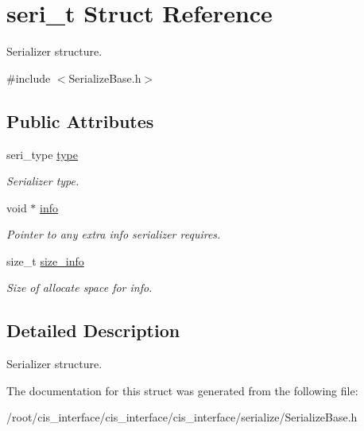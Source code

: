 \hypertarget{structseri__t}{}\section{seri\+\_\+t Struct Reference}
\label{structseri__t}


Serializer structure.  




{\ttfamily \#include $<$Serialize\+Base.\+h$>$}

\subsection*{Public Attributes}
\begin{DoxyCompactItemize}
\item 
\mbox{\label{structseri__t_a4278a7440cc158eb8c28010c5ad73724}} 
seri\+\_\+type \mbox{\hyperlink{structseri__t_a4278a7440cc158eb8c28010c5ad73724}{type}}
\begin{DoxyCompactList}\small\item\em Serializer type. \end{DoxyCompactList}\item 
\mbox{\label{structseri__t_afe8d056809d1f3155b50603a620a52ab}} 
void $\ast$ \mbox{\hyperlink{structseri__t_afe8d056809d1f3155b50603a620a52ab}{info}}
\begin{DoxyCompactList}\small\item\em Pointer to any extra info serializer requires. \end{DoxyCompactList}\item 
\mbox{\label{structseri__t_a6cf49790453343f2ebb5690b68342ac1}} 
size\+\_\+t \mbox{\hyperlink{structseri__t_a6cf49790453343f2ebb5690b68342ac1}{size\+\_\+info}}
\begin{DoxyCompactList}\small\item\em Size of allocate space for info. \end{DoxyCompactList}\end{DoxyCompactItemize}


\subsection{Detailed Description}
Serializer structure. 

The documentation for this struct was generated from the following file\+:\begin{DoxyCompactItemize}
\item 
/root/cis\+\_\+interface/cis\+\_\+interface/cis\+\_\+interface/serialize/Serialize\+Base.\+h\end{DoxyCompactItemize}
